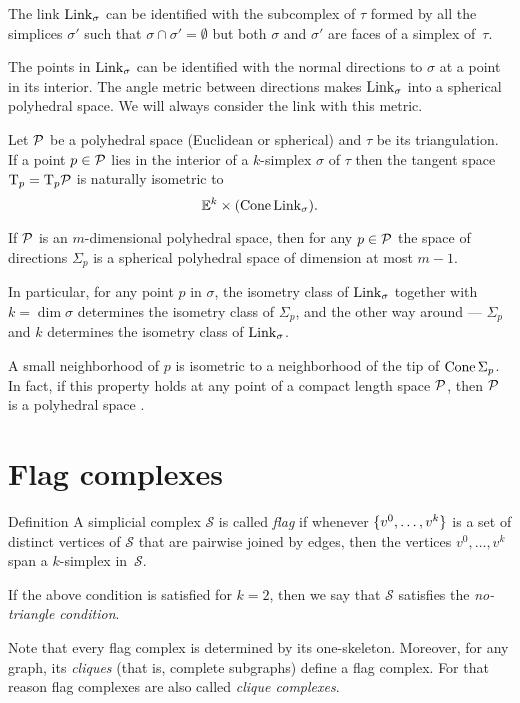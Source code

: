 The link $\mathop{\rm Link}\nolimits_\sigma$
can be identified with the subcomplex of $\tau$ 
formed by all the simplices $\sigma'$ 
such that $\sigma\cap\sigma'=\emptyset$ 
but both $\sigma$ and $\sigma'$ are faces of a simplex of~$\tau$.

The points in $\mathop{\rm Link}\nolimits_\sigma$ can be identified with the normal directions to $\sigma$ at a point in its interior.
The angle metric between directions makes  $\mathop{\rm Link}\nolimits_\sigma$ into a spherical polyhedral space.
We will always consider the link with this metric.

Let $\mathcal{P}$ be a polyhedral space (Euclidean or spherical) and  $\tau$ be its triangulation.
If a point $p\in \mathcal{P}$ 
lies in the interior of a $k$-simplex $\sigma$ of $\tau$ 
then the tangent space $\mathrm{T}_p=\mathrm{T}_p\mathcal{P}$
is  naturally isometric to
\[\mathbb{E}^k\times(\mathop{\rm Cone}\nolimits\mathop{\rm Link}\nolimits_\sigma).\]

If $\mathcal{P}$ is an $m$-dimensional polyhedral space,
then for any $p\in \mathcal{P}$
the space of directions $\Sigma_p$ is a spherical polyhedral space
of dimension at most $m-1$. 

In particular, 
for any point $p$ in $\sigma$,
the isometry class of $\mathop{\rm Link}\nolimits_\sigma$ together with $k=\dim\sigma$
determines the isometry class of $\Sigma_p$, 
 and the other way around --- $\Sigma_p$ and $k$ determines the isometry class of $\mathop{\rm Link}\nolimits_\sigma$.

A small neighborhood of $p$ is isometric to a neighborhood of the tip of $\mathop{\rm Cone}\nolimits\Sigma_p$. 
In fact, if this property holds at any point of a compact length space $\mathcal{P}$,
then  $\mathcal{P}$ is a polyhedral space \cite{lebedeva-petrunin}.

\section{Flag complexes}


\begin{thm}{Definition}\label{def:flag}
A simplicial complex $\mathcal{S}$ 
is called \emph{flag} if whenever $\{v^0,\z\dots,v^k\}$
is a set of distinct vertices of $\mathcal{S}$
that are pairwise joined by edges, then the vertices $v^0,\dots,v^k$
span a $k$-simplex in~$\mathcal{S}$.

If the above condition is satisfied for $k=2$, 
then we say that $\mathcal{S}$ satisfies 
the \emph{no-triangle condition}.
\end{thm}

Note that every flag complex is determined by its one-skeleton.
Moreover, for any graph, its \emph{cliques} (that is, complete subgraphs) define a flag complex.
For that reason  flag complexes are also called  \emph{clique complexes}.

